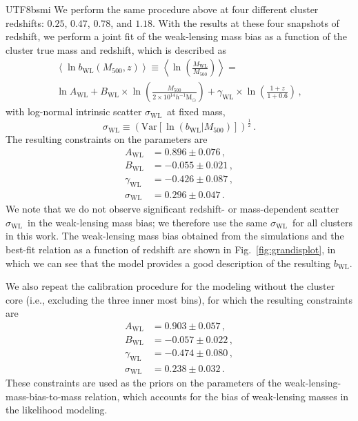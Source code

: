 \documentclass[longauth]{aa}
\newcommand{\Msunh}{\ensuremath{h^{-1}\mathrm{M}_{\odot}}}
\newcommand{\Mfiveoo}{\ensuremath{M_{500}}}
\newcommand{\redshift}{\ensuremath{z}}
\newcommand{\bwl}{\ensuremath{b_{\mathrm{WL}}}}
\newcommand{\Mwl}{\ensuremath{M_{\mathrm{WL}}}}
\newcommand{\Awl}{\ensuremath{A_{\mathrm{WL}}}}
\newcommand{\Bwl}{\ensuremath{B_{\mathrm{WL}}}}
\newcommand{\gammawl}{\ensuremath{\gamma_{\mathrm{WL}}}}
\newcommand{\sigmawl}{\ensuremath{\sigma_{\mathrm{WL}}}}
\begin{document}
\begin{CJK*}{UTF8}{bsmi}
We perform the same procedure above at four different cluster redshifts: $0.25$, $0.47$, $0.78$, and $1.18$.
With the results at these four snapshots of redshift, we perform a joint fit of the weak-lensing mass bias as a function of the cluster true mass and redshift, which is described as
%
\begin{multline}
\label{eq:bwl}
\left\langle\ln\bwl\left(\Mfiveoo, \redshift\right)\right\rangle \equiv 
\left\langle\ln\left(\frac{\Mwl}{\Mfiveoo}\right)\right\rangle =\\
\ln \Awl + B_{\mathrm{WL}}\times \ln\left(\frac{\Mfiveoo}{2\times10^{14}\Msunh}\right) +
\gamma_{\mathrm{WL}} \times \ln\left(\frac{1 + \redshift}{1 + 0.6}\right)
\, ,
\end{multline}
%
with log-normal intrinsic scatter \sigmawl\ at fixed mass,
%
\begin{equation}
\label{eq:bwl_sigma}
\sigmawl \equiv \left(\mathrm{Var}\left[\ln\left(\bwl|\Mfiveoo\right)\right] \right)^{\frac{1}{2}}
\, .
\end{equation}
%
The resulting constraints on the parameters are
%
\begin{align}
\label{eq:wlbias_constraints}
\Awl               &= 0.896   \pm 0.076    \, , \nonumber \\
\Bwl                &= -0.055 \pm 0.021   \, , \nonumber \\
\gammawl      &= -0.426 \pm 0.087   \, , \nonumber \\
\sigmawl        &= 0.296   \pm 0.047 \, .
\end{align}
%
We note that we do not observe significant redshift- or mass-dependent scatter  \sigmawl\ in the weak-lensing mass bias; we therefore use the same  \sigmawl\ for all clusters in this work.
The weak-lensing mass bias obtained from the simulations and the best-fit relation as a function of redshift are shown in Fig.~\ref{fig:grandisplot}, in which we can see that the model provides a good description of the resulting \bwl.


We also repeat the calibration procedure for the modeling without the cluster core (i.e., excluding the three inner most bins), for which the resulting constraints are
%
\begin{align}
\label{eq:wlbias_constraints_nocore}
\Awl               &= 0.903   \pm 0.057    \, , \nonumber \\
\Bwl                &= -0.057 \pm 0.022   \, , \nonumber \\
\gammawl      &= -0.474 \pm 0.080   \, , \nonumber \\
\sigmawl        &= 0.238   \pm 0.032  \, .
\end{align}
%
These constraints are used as the priors on the parameters of the weak-lensing-mass-bias-to-mass relation, which accounts for the bias of weak-lensing masses in the likelihood modeling.




\end{CJK*}
\end{document}
